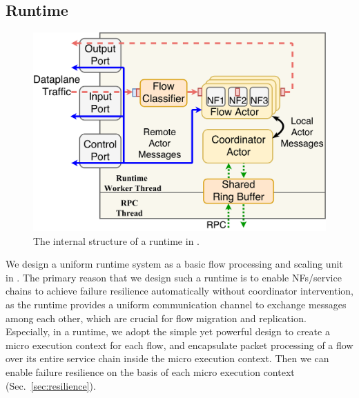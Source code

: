
\subsection{Runtime}
\label{sec:runtime}

\begin{figure}
		\centering
		\includegraphics[width=\columnwidth]{figure/new-nfactor-runtime-arch.pdf}

		\caption{The internal structure of a runtime in \nfactor.}
\label{fig:runtime-arch}
\end{figure}

We design a uniform runtime system as a basic flow processing and scaling unit in \nfactor. %
 The primary reason that we design such a runtime is to enable NFs/service chains to achieve failure resilience automatically without coordinator intervention, as the runtime provides a uniform communication channel to %
 exchange messages among each other, which are crucial for flow migration and replication.
  Especially, in a runtime, we adopt the simple yet powerful design to create a micro execution context for each flow, and encapsulate %
  packet processing of a flow over its entire service chain inside the micro execution context. Then we can enable failure resilience on the basis of each micro execution context (Sec.~\ref{sec:resilience}). %

